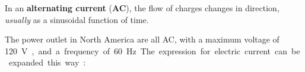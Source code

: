 In an \textbf{alternating current} (\textbf{AC}), the flow of charges changes
in direction, \emph{usually} as a sinusoidal function of time.
\begin{figure}[ht]
  \centering
  \begin{subfigure}{.45\textwidth}
    \centering
  \end{subfigure}
  \begin{subfigure}{.45\textwidth}
    \centering
  \end{subfigure}
\end{figure}

The power outlet in North America are all AC, with a maximum voltage of
\SI{120}\volt, and a frequency of \SI{60}\hertz.


The expression for electric current can be expanded this way:

